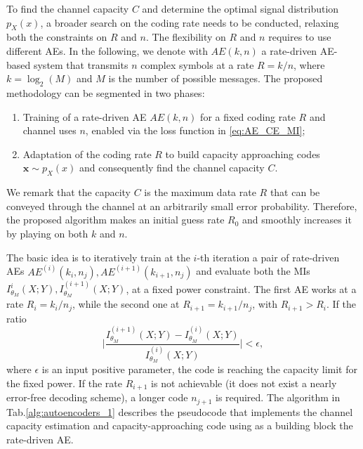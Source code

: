 To find the channel capacity $C$ and determine the optimal signal distribution $p_X(x)$, a broader search on the coding rate needs to be conducted, relaxing both the constraints on $R$ and $n$. The flexibility on $R$ and $n$ requires to use different AEs. In the following, we denote with $AE(k,n)$ a rate-driven AE-based system that transmits $n$ complex symbols at a rate $R=k/n$, where $k=\log_2(M)$ and $M$ is the number of possible messages. The proposed methodology can be segmented in two phases: 
\begin{enumerate}
\item Training of a rate-driven AE $AE(k,n)$ for a fixed coding rate $R$ and channel uses $n$, enabled via the loss function in \eqref{eq:AE_CE_MI};
\item Adaptation of the coding rate $R$ to build capacity approaching codes $\mathbf{x}\sim p_X(x)$ and consequently find the channel capacity $C$.
\end{enumerate}
We remark that the capacity $C$ is the maximum data rate $R$ that can be conveyed through the channel at an arbitrarily small error probability. Therefore, the proposed algorithm makes an initial guess rate $R_0$ and smoothly increases it by playing on both $k$ and $n$. 

The basic idea is to iteratively train at the $i$-th iteration a pair of rate-driven AEs $AE^{(i)}(k_i,n_j), AE^{(i+1)}(k_{i+1},n_j)$ and evaluate both the MIs $I^{i}_{\theta_M}(X;Y), I^{(i+1)}_{\theta_M}(X;Y)$, at a fixed power constraint. The first AE works at a rate $R_i=k_i/n_j$, while the second one at $R_{i+1}=k_{i+1}/n_j$, with $R_{i+1}>R_i$. If the ratio 
\begin{equation}
\biggl|\frac{I^{(i+1)}_{\theta_M}(X;Y)-I^{(i)}_{\theta_M}(X;Y)}{I^{(i)}_{\theta_M}(X;Y)}\biggr|<\epsilon,
\end{equation}
where $\epsilon$ is an input positive parameter, the code is reaching the capacity limit for the fixed power. If the rate $R_{i+1}$ is not achievable (it does not exist a nearly error-free decoding scheme), a longer code $n_{j+1}$ is required. The algorithm in Tab.\ref{alg:autoencoders_1} describes the pseudocode that implements the channel capacity estimation and capacity-approaching code using as a building block the rate-driven AE.

